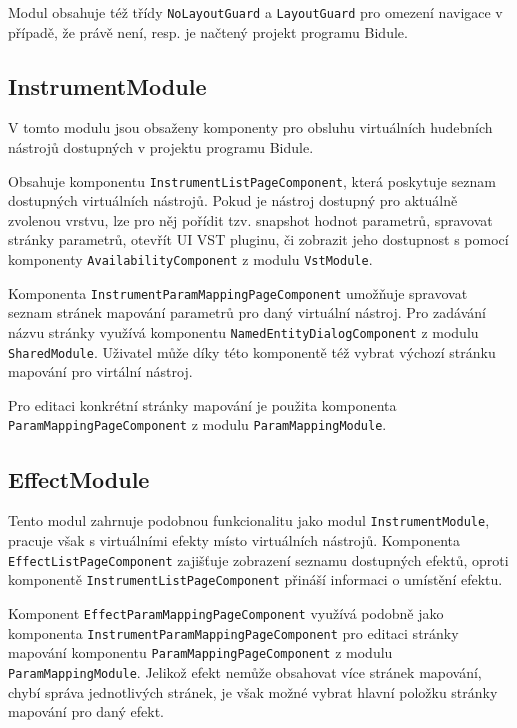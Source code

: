 \documentclass[thesis=M,czech]{FITthesis}[2019/03/06]
\begin{document}
			Modul obsahuje též třídy \texttt{NoLayoutGuard} a \texttt{LayoutGuard} pro omezení navigace v případě, že právě není, resp. je načtený projekt programu Bidule.
			
		\subsection{InstrumentModule}
			V tomto modulu jsou obsaženy komponenty pro obsluhu virtuálních hudebních nástrojů dostupných v projektu programu Bidule.			

			Obsahuje komponentu \texttt{Instrument\-List\-Page\-Component}, která poskytuje seznam dostupných virtuálních nástrojů.
			Pokud je nástroj dostupný pro aktuálně zvolenou vrstvu, lze pro něj pořídit tzv. snapshot hodnot parametrů, spravovat stránky parametrů, otevřít UI VST pluginu,
			či zobrazit jeho dostupnost s pomocí komponenty \texttt{Availability\-Component} z modulu \texttt{VstModule}.
			
			Komponenta \texttt{Instrument\-Param\-Mapping\-Page\-Component} umožňuje spravovat seznam stránek mapování parametrů pro daný virtuální nástroj.
			Pro zadávání názvu stránky využívá komponentu \texttt{Named\-Entity\-Dialog\-Component} z modulu \texttt{SharedModule}.
			Uživatel může díky této komponentě též vybrat výchozí stránku mapování pro virtální nástroj.
			
			Pro editaci konkrétní stránky mapování je použita komponenta \texttt{Param\-Mapping\-Page\-Component} z modulu \texttt{Param\-Mapping\-Module}.
		
		\subsection{EffectModule}
			Tento modul zahrnuje podobnou funkcionalitu jako modul \texttt{Instrument\-Module}, pracuje však s virtuálními efekty místo virtuálních nástrojů.
			Komponenta \texttt{Effect\-List\-Page\-Component} zajišťuje zobrazení seznamu dostupných efektů, oproti komponentě \texttt{Instrument\-List\-Page\-Component} přináší informaci o umístění efektu.
			
			Komponent \texttt{Effect\-Param\-Mapping\-Page\-Component} využívá podobně jako komponenta \texttt{Instrument\-ParamMapping\-Page\-Component} pro editaci stránky mapování komponentu \texttt{ParamMapping\-Page\-Component} z modulu \texttt{Param\-Mapping\-Module}. Jelikož efekt nemůže obsahovat více stránek mapování, chybí správa jednotlivých stránek, je však možné vybrat hlavní položku stránky mapování pro daný efekt.
\end{document}
